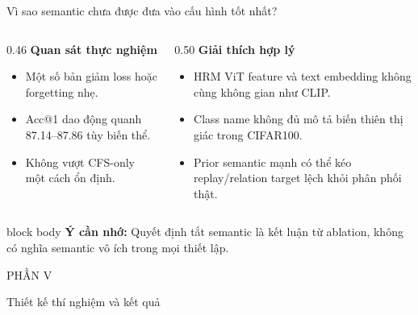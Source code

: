 \documentclass[aspectratio=169,11pt]{beamer}
\newcommand{\remember}[1]{%
  \vfill
  \begin{beamercolorbox}[wd=\textwidth,sep=0.22cm,rounded=true]{block body}
    \textbf{Ý cần nhớ:} #1
  \end{beamercolorbox}
}
\newcommand{\sectionframe}[2]{%
  \begin{frame}[plain]
    \vfill
    {\large\color{HRMBlue}#1}\par\vspace{0.35cm}
    {\Huge\color{HRMDark}#2}\par
    \vfill
  \end{frame}
}
\begin{document}
\begin{frame}{Vì sao semantic chưa được đưa vào cấu hình tốt nhất?}
  \begin{columns}[T,onlytextwidth]
    \begin{column}{0.46\textwidth}
      {\large\bfseries Quan sát thực nghiệm}\par\vspace{0.25cm}
      \begin{itemize}\setlength\itemsep{0.25cm}
        \item Một số bản giảm loss hoặc forgetting nhẹ.
        \item Acc@1 dao động quanh 87.14--87.86 tùy biến thể.
        \item Không vượt CFS-only một cách ổn định.
      \end{itemize}
    \end{column}
    \begin{column}{0.50\textwidth}
      {\large\bfseries Giải thích hợp lý}\par\vspace{0.25cm}
      \begin{itemize}\setlength\itemsep{0.25cm}
        \item HRM ViT feature và text embedding không cùng không gian như CLIP.
        \item Class name không đủ mô tả biến thiên thị giác trong CIFAR100.
        \item Prior semantic mạnh có thể kéo replay/relation target lệch khỏi phân phối thật.
      \end{itemize}
    \end{column}
  \end{columns}
  \remember{Quyết định tắt semantic là kết luận từ ablation, không có nghĩa semantic vô ích trong mọi thiết lập.}
\end{frame}

\sectionframe{PHẦN V}{Thiết kế thí nghiệm và kết quả}
\end{document}
